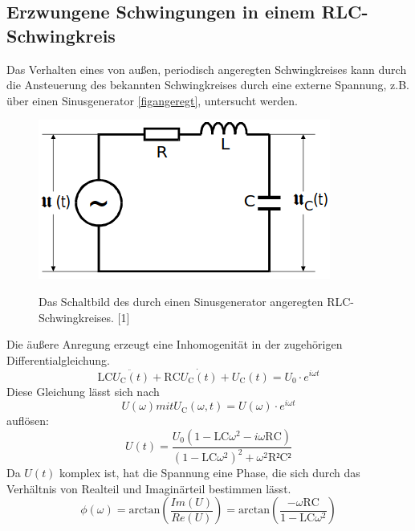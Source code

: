 \documentclass[titlepage = firstcover]{scrartcl}
\begin{document}
        \subsection{Erzwungene Schwingungen in einem RLC-Schwingkreis}
            Das Verhalten eines von außen, periodisch angeregten Schwingkreises kann durch die Ansteuerung des bekannten Schwingkreises durch eine externe Spannung, z.B.
            über einen Sinusgenerator \ref{figangeregt}, untersucht werden. 
            \begin{figure}[h]
                \centering
                \caption{Das Schaltbild des durch einen Sinusgenerator angeregten RLC-Schwingkreises. [1]}
                \includegraphics[width = 0.4\linewidth]{angeregt.png}
                \label{fig:angeregt}
            \end{figure}
            \FloatBarrier
            Die äußere Anregung erzeugt eine Inhomogenität in der zugehörigen Differentialgleichung.
            \begin{equation}
                \text{LC}\ddot{U_{\text{C}}(t)} + \text{RC} \dot{U_{\text{C}}(t)} + U_{\text{C}}(t) = U_0 \cdot e^{i\omega t}
                \label{eqn:angeregt}
            \end{equation}
            Diese Gleichung lässt sich nach 
            \begin{equation*}
                U(\omega) mit U_\text{C}(\omega,t) = U(\omega) \cdot e^{i\omega t}
            \end{equation*}
            auflösen:
            \begin{equation}
                U(t) = \frac{U_0 (1-\text{LC}\omega^2-i\omega \text{RC})}{(1-\text{LC}\omega^2)^2 + \omega^2\text{R²C²}}
                \label{eqn:Uangeregt}
            \end{equation}
            Da $U(t)$ komplex ist, hat die Spannung eine Phase, die sich durch das Verhältnis von Realteil und Imaginärteil bestimmen lässt.
            \begin{equation}
                \phi (\omega) = \text{arctan}\left(\frac{Im(U)}{Re(U)}\right) = \text{arctan}\left(\frac{-\omega \text{RC}}{1-\text{LC}\omega^2}\right)
                \label{eqn:Phase}
            \end{equation}
\end{document}
